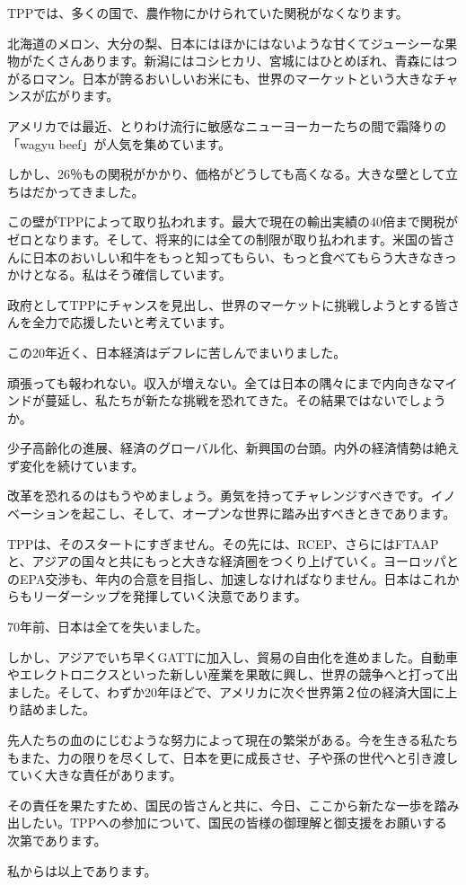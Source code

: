 TPPでは、多くの国で、農作物にかけられていた関税がなくなります。\par
北海道のメロン、大分の梨、日本にはほかにはないような甘くてジューシーな果物がたくさんあります。新潟にはコシヒカリ、宮城にはひとめぼれ、青森にはつがるロマン。日本が誇るおいしいお米にも、世界のマーケットという大きなチャンスが広がります。\par
アメリカでは最近、とりわけ流行に敏感なニューヨーカーたちの間で霜降りの「wagyu beef」が人気を集めています。\par
しかし、26％もの関税がかかり、価格がどうしても高くなる。大きな壁として立ちはだかってきました。\par
この壁がTPPによって取り払われます。最大で現在の輸出実績の40倍まで関税がゼロとなります。そして、将来的には全ての制限が取り払われます。米国の皆さんに日本のおいしい和牛をもっと知ってもらい、もっと食べてもらう大きなきっかけとなる。私はそう確信しています。\par
政府としてTPPにチャンスを見出し、世界のマーケットに挑戦しようとする皆さんを全力で応援したいと考えています。\par
この20年近く、日本経済はデフレに苦しんでまいりました。\par
頑張っても報われない。収入が増えない。全ては日本の隅々にまで内向きなマインドが蔓延し、私たちが新たな挑戦を恐れてきた。その結果ではないでしょうか。\par
少子高齢化の進展、経済のグローバル化、新興国の台頭。内外の経済情勢は絶えず変化を続けています。\par
改革を恐れるのはもうやめましょう。勇気を持ってチャレンジすべきです。イノベーションを起こし、そして、オープンな世界に踏み出すべきときであります。\par
TPPは、そのスタートにすぎません。その先には、RCEP、さらにはFTAAPと、アジアの国々と共にもっと大きな経済圏をつくり上げていく。ヨーロッパとのEPA交渉も、年内の合意を目指し、加速しなければなりません。日本はこれからもリーダーシップを発揮していく決意であります。\par
70年前、日本は全てを失いました。\par
しかし、アジアでいち早くGATTに加入し、貿易の自由化を進めました。自動車やエレクトロニクスといった新しい産業を果敢に興し、世界の競争へと打って出ました。そして、わずか20年ほどで、アメリカに次ぐ世界第２位の経済大国に上り詰めました。\par
先人たちの血のにじむような努力によって現在の繁栄がある。今を生きる私たちもまた、力の限りを尽くして、日本を更に成長させ、子や孫の世代へと引き渡していく大きな責任があります。\par
その責任を果たすため、国民の皆さんと共に、今日、ここから新たな一歩を踏み出したい。TPPへの参加について、国民の皆様の御理解と御支援をお願いする次第であります。\par
私からは以上であります。\par

